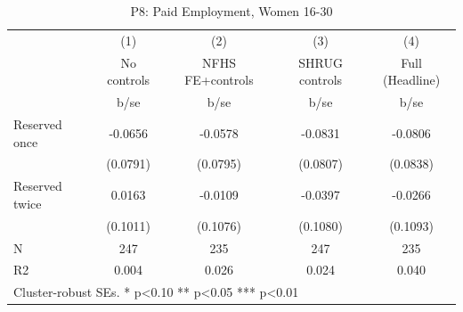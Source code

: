 \begin{table}[htbp]\centering
\def\sym#1{\ifmmode^{#1}\else\(^{#1}\)\fi}
\caption{P8: Paid Employment, Women 16-30}
\begin{tabular}{l*{4}{c}}
\toprule
            &\multicolumn{1}{c}{(1)}   &\multicolumn{1}{c}{(2)}   &\multicolumn{1}{c}{(3)}   &\multicolumn{1}{c}{(4)}   \\
            & No controls   &NFHS FE+controls   &SHRUG controls   &Full (Headline)   \\
            &        b/se   &        b/se   &        b/se   &        b/se   \\
\midrule
Reserved once&     -0.0656   &     -0.0578   &     -0.0831   &     -0.0806   \\
            &    (0.0791)   &    (0.0795)   &    (0.0807)   &    (0.0838)   \\
Reserved twice&      0.0163   &     -0.0109   &     -0.0397   &     -0.0266   \\
            &    (0.1011)   &    (0.1076)   &    (0.1080)   &    (0.1093)   \\
\midrule
N           &         247   &         235   &         247   &         235   \\
R2          &       0.004   &       0.026   &       0.024   &       0.040   \\
\bottomrule
\multicolumn{5}{l}{\footnotesize Cluster-robust SEs. * p<0.10 ** p<0.05 *** p<0.01}\\
\end{tabular}
\end{table}
